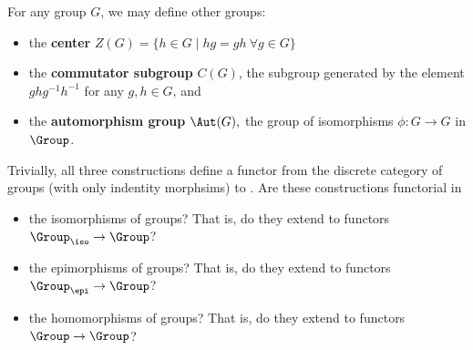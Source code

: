 \documentclass[../../main]{subfiles}
\begin{document}
\begin{exercise}
For any group $G$, we may define other groups:
\begin{itemize}
    \item the \textbf{center} $Z(G) = \{h \in G \mid hg = gh\ \forall g\in G\}$
	\item the \textbf{commutator subgroup} $C(G)$, the subgroup generated by the
		element $ghg^{-1}h^{-1}$ for any $g,h \in G$, and
	\item the \textbf{automorphism group} $ \Aut(G), $ the group of isomorphisms
		$\phi\colon G \rightarrow G$ in $\Group$.
\end{itemize}
Trivially, all three constructions define a functor from the discrete category of groups (with only indentity morphsims) to \Group. Are these constructions functorial in
\begin{itemize}
	\item the isomorphisms of groups? That is, do they extend to functors
		$\Group_{\iso} \rightarrow \Group$?
	\item the epimorphisms of groups? That is, do they extend to functors
		$\Group_{\epi} \rightarrow \Group$?
	\item the homomorphisms of groups? That is, do they extend to functors
		$\Group \rightarrow \Group$?
\end{itemize}
\end{exercise}
\end{document}
